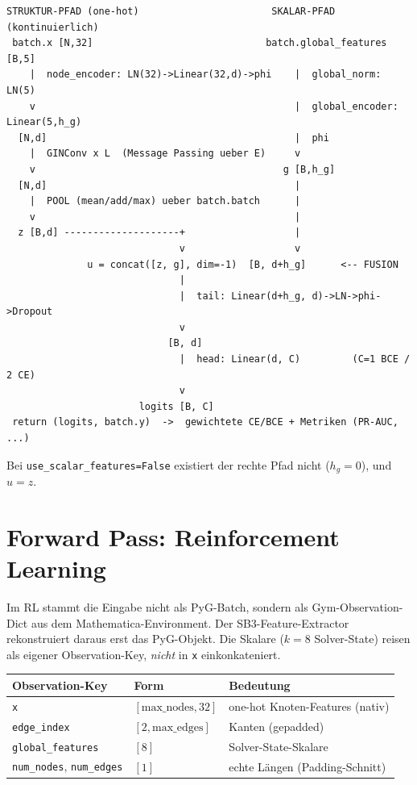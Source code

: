 \documentclass[11pt,a4paper]{article}
\newcommand{\code}[1]{\texttt{#1}}
\begin{document}
\begin{lstlisting}[style=ascii]
   STRUKTUR-PFAD (one-hot)                       SKALAR-PFAD (kontinuierlich)
 batch.x [N,32]                              batch.global_features [B,5]
    |  node_encoder: LN(32)->Linear(32,d)->phi    |  global_norm: LN(5)
    v                                             |  global_encoder: Linear(5,h_g)
  [N,d]                                           |  phi
    |  GINConv x L  (Message Passing ueber E)     v
    v                                           g [B,h_g]
  [N,d]                                           |
    |  POOL (mean/add/max) ueber batch.batch      |
    v                                             |
  z [B,d] --------------------+                   |
                              v                   v
              u = concat([z, g], dim=-1)  [B, d+h_g]      <-- FUSION
                              |
                              |  tail: Linear(d+h_g, d)->LN->phi->Dropout
                              v
                            [B, d]
                              |  head: Linear(d, C)         (C=1 BCE / 2 CE)
                              v
                       logits [B, C]
 return (logits, batch.y)  ->  gewichtete CE/BCE + Metriken (PR-AUC, ...)
\end{lstlisting}

Bei \code{use\_scalar\_features=False} existiert der rechte Pfad nicht
($h_g{=}0$), und $u=z$.

\section{Forward Pass: Reinforcement Learning}

Im RL stammt die Eingabe nicht als PyG-Batch, sondern als Gym-Observation-Dict aus
dem Mathematica-Environment. Der SB3-Feature-Extractor rekonstruiert daraus erst
das PyG-Objekt. Die Skalare ($k{=}8$ Solver-State) reisen als eigener
Observation-Key, \emph{nicht} in \code{x} einkonkateniert.

\begin{center}\small
\begin{tabular}{@{}lll@{}}
\toprule
Observation-Key & Form & Bedeutung \\
\midrule
\code{x} & $[\text{max\_nodes}, 32]$ & one-hot Knoten-Features (nativ) \\
\code{edge\_index} & $[2, \text{max\_edges}]$ & Kanten (gepadded) \\
\code{global\_features} & $[8]$ & Solver-State-Skalare \\
\code{num\_nodes}, \code{num\_edges} & $[1]$ & echte Längen (Padding-Schnitt) \\
\bottomrule
\end{tabular}
\end{center}
\end{document}
